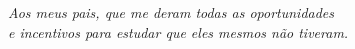 \documentclass[
	12pt,				%
	openright,			%
	oneside,			%
	a4paper,			%
	chapter=TITLE,		%
	section=TITLE,		%
	subsection=TITLE,	%
	subsubsection=TITLE,%
	english,			%
	brazil				%
	]{abntex2}
\theoremstyle{definition}
\begin{document}
\nocite{Vrs:2018}

\frenchspacing 



\imprimircapa

\imprimirfolhaderosto


%     


\newpage

%
\begin{folhadeaprovacao}
\imprimirfolhadeaprovacao
\end{folhadeaprovacao}





\begin{dedicatoria}
   \vspace*{\fill}
   \flushright
   \textit{Aos meus pais, que me deram todas as oportunidades \\e incentivos para estudar que eles mesmos não tiveram.}
\end{dedicatoria}
\end{document}
